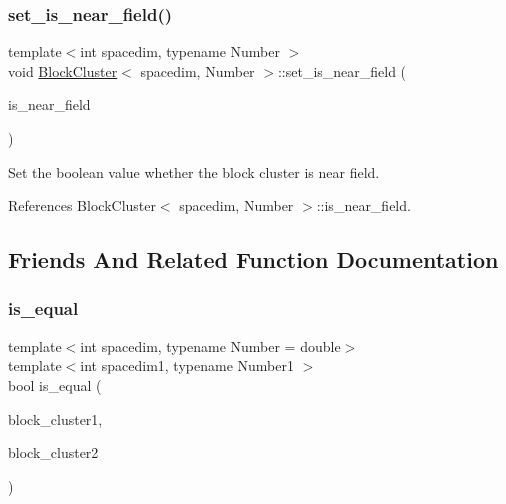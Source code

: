 \mbox{\label{classBlockCluster_a89063f39db2c5868abb54650108623dc}} 
\subsubsection{\texorpdfstring{set\+\_\+is\+\_\+near\+\_\+field()}{set\_is\_near\_field()}}
{\footnotesize\ttfamily template$<$int spacedim, typename Number $>$ \\
void \hyperlink{classBlockCluster}{Block\+Cluster}$<$ spacedim, Number $>$\+::set\+\_\+is\+\_\+near\+\_\+field (\begin{DoxyParamCaption}\item[{const bool}]{is\+\_\+near\+\_\+field }\end{DoxyParamCaption})}

Set the boolean value whether the block cluster is near field. 

References Block\+Cluster$<$ spacedim, Number $>$\+::is\+\_\+near\+\_\+field.



\subsection{Friends And Related Function Documentation}
\mbox{\label{classBlockCluster_a770daa1c7399aa72cfb7e1e7dc65b6bb}} 
\subsubsection{\texorpdfstring{is\+\_\+equal}{is\_equal}}
{\footnotesize\ttfamily template$<$int spacedim, typename Number = double$>$ \\
template$<$int spacedim1, typename Number1 $>$ \\
bool is\+\_\+equal (\begin{DoxyParamCaption}\item[{const \hyperlink{classBlockCluster}{Block\+Cluster}$<$ spacedim, Number $>$ \&}]{block\+\_\+cluster1,  }\item[{const \hyperlink{classBlockCluster}{Block\+Cluster}$<$ spacedim, Number $>$ \&}]{block\+\_\+cluster2 }\end{DoxyParamCaption})\hspace{0.3cm}{\ttfamily [friend]}}

